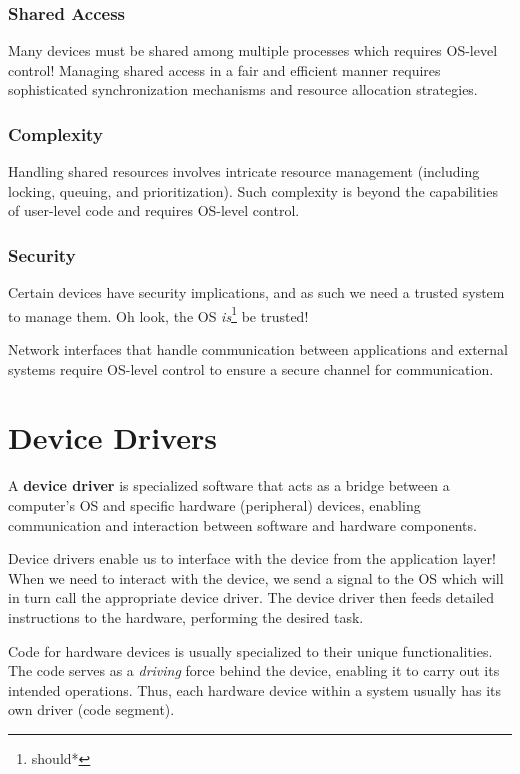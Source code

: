 \documentclass{report}
\newcommand{\definitionBegin}[1]{\begin{tcolorbox}[title={Definition: #1}]}
\newcommand{\definitionEnd}{\end{tcolorbox}}
\newcommand{\exampleBegin}[1]{\begin{tcolorbox}[colback=blue!5!white,colframe=black!75!blue,title={Example:
      #1}]}
\newcommand{\exampleEnd}{\end{tcolorbox}}
\begin{document}
\subsubsection{Shared Access}
Many devices must be shared among multiple processes which requires OS-level control! Managing
shared access in a fair and efficient manner requires sophisticated synchronization mechanisms and
resource allocation strategies.


\subsubsection{Complexity}
Handling shared resources involves intricate resource management (including locking, queuing, and
prioritization). Such complexity is beyond the capabilities of user-level code and requires OS-level
control.


\subsubsection{Security}
Certain devices have security implications, and as such we need a trusted system to manage them. Oh
look, the OS \textit{is}\footnote{should*} be trusted!

\exampleBegin{Network Interfaces}
Network interfaces that handle communication between applications and external
systems require OS-level control to ensure a secure channel for communication.
\exampleEnd





\section{Device Drivers}
\definitionBegin{Device Driver}
A \textbf{device driver} is specialized software that acts as a bridge between a computer's OS and
specific hardware (peripheral) devices, enabling communication and interaction between software and
hardware components.
\definitionEnd

Device drivers enable us to interface with the device from the application layer! When we need to
interact with the device, we send a signal to the OS which will in turn call the appropriate device
driver. The device driver then feeds detailed instructions to the hardware, performing the desired task.

Code for hardware devices is usually specialized to their unique functionalities. The code serves as
a \textit{driving} force behind the device, enabling it to carry out its intended operations. Thus,
each hardware device within a system usually has its own driver (code segment).
\end{document}
